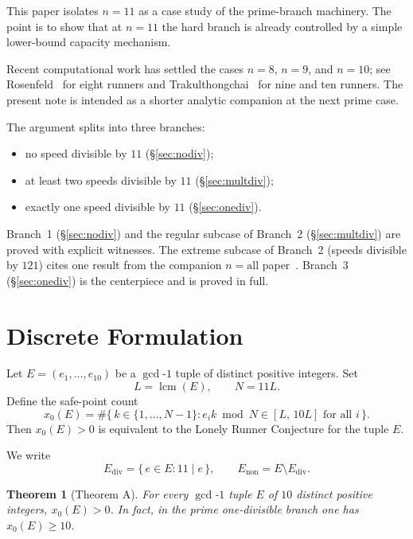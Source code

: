 \documentclass[11pt]{article}
\newtheorem{theorem}{Theorem}[section]
\theoremstyle{definition}
\newcommand{\Ediv}{E_{\mathrm{div}}}
\newcommand{\Enon}{E_{\mathrm{non}}}
\begin{document}
This paper isolates $n = 11$ as a case study of the prime-branch machinery.
The point is to show that at $n = 11$ the hard branch is already
controlled by a simple lower-bound capacity mechanism.

Recent computational work has settled the cases $n = 8$, $n = 9$, and
$n = 10$; see Rosenfeld~\cite{Ros25} for eight runners and
Trakulthongchai~\cite{Tra25} for nine and ten runners.
The present note is intended as a shorter analytic companion at the next
prime case.

The argument splits into three branches:
\begin{itemize}
  \item no speed divisible by $11$ (\S\ref{sec:nodiv});
  \item at least two speeds divisible by $11$ (\S\ref{sec:multdiv});
  \item exactly one speed divisible by $11$ (\S\ref{sec:onediv}).
\end{itemize}

Branch~1 (\S\ref{sec:nodiv}) and the regular subcase of Branch~2
(\S\ref{sec:multdiv}) are proved with explicit witnesses.
The extreme subcase of Branch~2 (speeds divisible by $121$) cites one
result from the companion $n = \text{all}$ paper~\cite{Pal26}.
Branch~3 (\S\ref{sec:onediv}) is the centerpiece and is proved in full.

\section{Discrete Formulation}
\label{sec:formulation}

Let $E = (e_1, \ldots, e_{10})$ be a $\gcd$-$1$ tuple of distinct positive
integers.
Set
\[
  L = \operatorname{lcm}(E), \qquad N = 11L.
\]
Define the safe-point count
\[
  x_0(E) = \#\bigl\{\, k \in \{1,\ldots,N-1\}
    : e_i k \bmod N \in [L,\, 10L] \text{ for all } i \,\bigr\}.
\]
Then $x_0(E) > 0$ is equivalent to the Lonely Runner Conjecture for the
tuple $E$.

We write
\[
  \Ediv = \{\, e \in E : 11 \mid e \,\}, \qquad
  \Enon = E \setminus \Ediv.
\]

\begin{theorem}[Theorem A]
  \label{thm:main}
  For every $\gcd$-$1$ tuple $E$ of $10$ distinct positive integers,
  $x_0(E) > 0$.
  In fact, in the prime one-divisible branch one has $x_0(E) \geq 10$.
\end{theorem}
\end{document}
